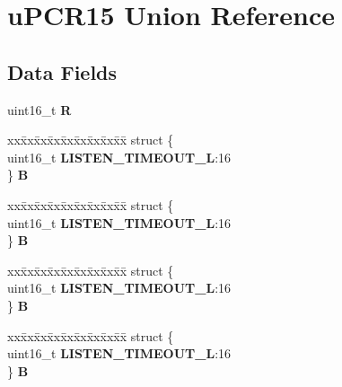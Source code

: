 \hypertarget{unionuPCR15}{}\section{u\+P\+C\+R15 Union Reference}
\label{unionuPCR15}
\subsection*{Data Fields}
\begin{DoxyCompactItemize}
\item 
\mbox{\label{unionuPCR15_a8ccaf1841aff9d463d47293923671825}} 
uint16\+\_\+t {\bfseries R}
\item 
\mbox{\label{unionuPCR15_a8b9af22887276ad7f5e6c03eeb7d977f}} 
\begin{tabbing}
xx\=xx\=xx\=xx\=xx\=xx\=xx\=xx\=xx\=\kill
struct \{\\
\>uint16\_t {\bfseries LISTEN\_TIMEOUT\_L}:16\\
\} {\bfseries B}\\

\end{tabbing}\item 
\mbox{\label{unionuPCR15_aa38ec90e140dd1c240f70cb3933fb6b3}} 
\begin{tabbing}
xx\=xx\=xx\=xx\=xx\=xx\=xx\=xx\=xx\=\kill
struct \{\\
\>uint16\_t {\bfseries LISTEN\_TIMEOUT\_L}:16\\
\} {\bfseries B}\\

\end{tabbing}\item 
\mbox{\label{unionuPCR15_a57ff260d0819006757dc15629887c6ee}} 
\begin{tabbing}
xx\=xx\=xx\=xx\=xx\=xx\=xx\=xx\=xx\=\kill
struct \{\\
\>uint16\_t {\bfseries LISTEN\_TIMEOUT\_L}:16\\
\} {\bfseries B}\\

\end{tabbing}\item 
\mbox{\label{unionuPCR15_ab7c1ad2177260cdc022ee53e8d65c48c}} 
\begin{tabbing}
xx\=xx\=xx\=xx\=xx\=xx\=xx\=xx\=xx\=\kill
struct \{\\
\>uint16\_t {\bfseries LISTEN\_TIMEOUT\_L}:16\\
\} {\bfseries B}\\

\end{tabbing}\end{DoxyCompactItemize}


